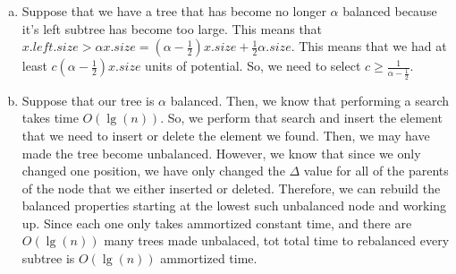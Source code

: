 \documentclass{article}
\begin{document}
\begin{enumerate}[a.]
 \item
Suppose that we have a tree that has become no longer $\alpha$ balanced because it's left subtree has become too large. This means that $x.left.size > \alpha x.size = (\alpha -\frac{1}{2}) x.size + \frac{1}{2} \alpha.size$. This means that we had at least $c(\alpha -\frac{1}{2}) x.size$ units of potential. So, we need to select $c \ge \frac{1}{\alpha -\frac{1}{2}}$. 
 \item
 Suppose that our tree is $\alpha$ balanced. Then, we know that performing a search takes time $O(\lg(n))$. So, we perform that search and insert the element that we need to insert or delete the element we found. Then, we may have made the tree become unbalanced. However, we know that since we only changed one position, we have only changed the $\Delta$ value for all of the parents of the node that we either inserted or deleted. Therefore, we can rebuild the balanced properties starting at the lowest such unbalanced node and working up. Since each one only takes ammortized constant time, and there are $O(\lg(n))$ many trees made unbalaced, tot total time to rebalanced every subtree is $O(\lg(n))$ ammortized time.
 
 
\end{enumerate}
\end{document}
